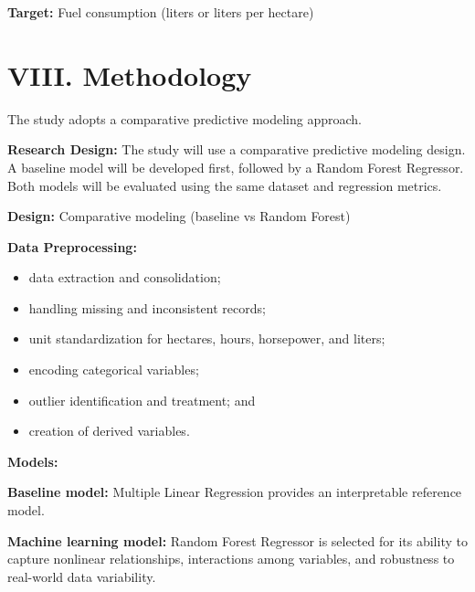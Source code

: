 \documentclass[11pt,twocolumn]{article}
\begin{document}
\vspace{10pt}

\textbf{Target:} Fuel consumption (liters or liters per hectare)

\section*{VIII. Methodology}

\vspace{10pt}

The study adopts a comparative predictive modeling approach.

\vspace{10pt}

\textbf{\small Research Design:} The study will use a comparative predictive modeling design. A baseline model will be developed first, followed by a Random Forest Regressor. Both models will be evaluated using the same dataset and regression metrics.

\vspace{10pt}

\textbf{Design:} Comparative modeling (baseline vs Random Forest)

\vspace{10pt}

\textbf{Data Preprocessing:}
\begin{itemize}
\item data extraction and consolidation;
\item handling missing and inconsistent records;
\item unit standardization for hectares, hours, horsepower, and liters;
\item encoding categorical variables;
\item outlier identification and treatment; and
\item creation of derived variables.
\end{itemize}

\vspace{10pt}

\textbf{Models:}

\vspace{10pt}

\textbf{\small Baseline model:} Multiple Linear Regression provides an interpretable reference model.

\vspace{10pt}

\textbf{\small Machine learning model:} Random Forest Regressor is selected for its ability to capture nonlinear relationships, interactions among variables, and robustness to real-world data variability.
\end{document}
